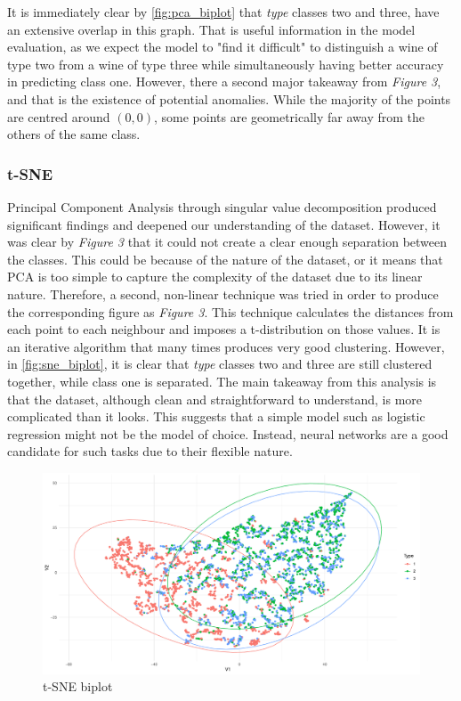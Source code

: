 \documentclass[11pt,twoside]{article}
\numberwithin{Theorem}{section}
\numberwithin{Definition}{section}
\numberwithin{Lemma}{section}
\numberwithin{Algorithm}{section}
\numberwithin{equation}{section}
\begin{document}
\vspace{2em}
It is immediately clear by \autoref{fig:pca_biplot} that \textit{type} classes two and three, have an extensive overlap in this graph. That is useful information in the model evaluation, as we expect the model to "find it difficult" to distinguish a wine of type two from a wine of type three while simultaneously having better accuracy in predicting class one. However, there a second major takeaway from \textit{Figure 3}, and that is the existence of potential anomalies. While the majority of the points are centred around $(0,0)$, some points are geometrically far away from the others of the same class.
\subsubsection{t-SNE}
\label{sec:tsne}
Principal Component Analysis through singular value decomposition produced significant findings and deepened our understanding of the dataset. However, it was clear by \textit{Figure 3} that it could not create a clear enough separation between the classes. This could be because of the nature of the dataset, or it means that PCA is too simple to capture the complexity of the dataset due to its linear nature.
Therefore, a second, non-linear technique was tried in order to produce the corresponding figure as \textit{Figure 3}. This technique calculates the distances from each point to each neighbour and imposes a t-distribution on those values. It is an iterative algorithm that many times produces very good clustering. However, in \autoref{fig:sne_biplot}, it is clear that \textit{type} classes two and three are still clustered together, while class one is separated.
The main takeaway from this analysis is that the dataset, although clean and straightforward to understand, is more complicated than it looks. This suggests that a simple model such as logistic regression might not be the model of choice. Instead, neural networks are a good candidate for such tasks due to their flexible nature.
\vspace*{1em}
\begin{figure}[!h]
\centering
\includegraphics[width=\textwidth]{./output/1.d.t-sne.pdf}
\caption{t-SNE biplot}
\label{fig:sne_biplot}
\end{figure}
\vspace{2em}
\end{document}
